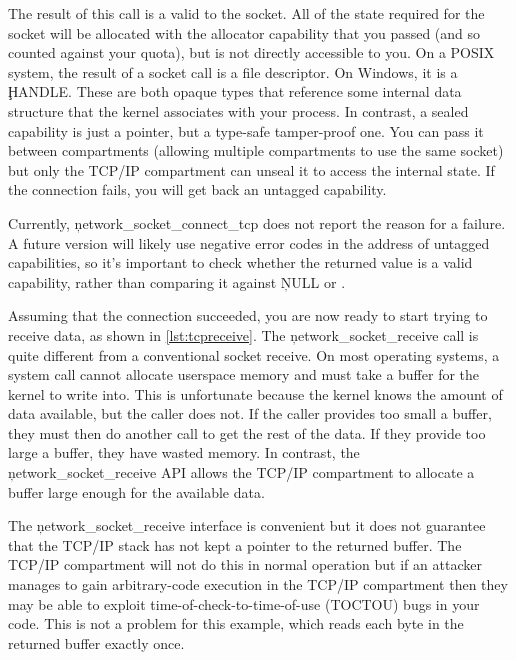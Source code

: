{\codelisting[filename=examples/tcp/tcp.cc,marker=connect,label=lst:tcpconnect,caption="Connecting to a remote server."]{}

The result of this call is a valid  to the socket.
All of the state required for the socket will be allocated with the allocator capability that you passed (and so counted against your quota), but is not directly accessible to you.
On a POSIX system, the result of a socket call is a file descriptor.
On Windows, it is a \c{HANDLE}.
These are both opaque types that reference some internal data structure that the kernel associates with your process.
In contrast, a sealed capability is just a pointer, but a type-safe tamper-proof one.
You can pass it between compartments (allowing multiple compartments to use the same socket) but only the TCP/IP compartment can unseal it to access the internal state.
If the connection fails, you will get back an untagged capability.

\begin{note}
Currently, \c{network_socket_connect_tcp} does not report the reason for a failure.
A future version will likely use negative error codes in the address of untagged capabilities, so it's important to check whether the returned value is a valid capability, rather than comparing it against \c{NULL} or .
\end{note}

Assuming that the connection succeeded, you are now ready to start trying to receive data, as shown in \ref{lst:tcpreceive}.
The \c{network_socket_receive} call is quite different from a conventional socket receive.
On most operating systems, a system call cannot allocate userspace memory and must take a buffer for the kernel to write into.
This is unfortunate because the kernel knows the amount of data available, but the caller does not.
If the caller provides too small a buffer, they must then do another call to get the rest of the data.
If they provide too large a buffer, they have wasted memory.
In contrast, the \c{network_socket_receive} API allows the TCP/IP compartment to allocate a buffer large enough for the available data.

\codelisting[filename=examples/tcp/tcp.cc,marker=receive,label=lst:tcpreceive,caption="Receiving data from a remote server."]{}

\begin{caution}
The \c{network_socket_receive} interface is convenient but it does not guarantee that the TCP/IP stack has not kept a pointer to the returned buffer.
The TCP/IP compartment will not do this in normal operation but if an attacker manages to gain arbitrary-code execution in the TCP/IP compartment then they may be able to exploit time-of-check-to-time-of-use (TOCTOU) bugs in your code.
This is not a problem for this example, which reads each byte in the returned buffer exactly once.
\end{caution}

}

